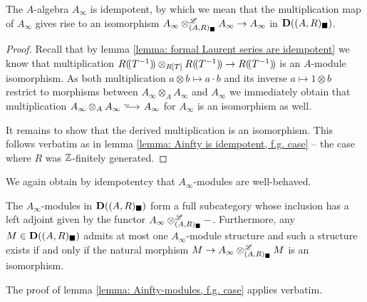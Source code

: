 \begin{lemma}
	
	The $A$-algebra $A_\infty$ is idempotent, by which we mean that the multiplication map of $A_\infty$ gives rise to an isomorphism $A_\infty\otimes^{\mathscr{L}}_{(A, R)_\blacksquare} A_\infty \to A_\infty$ in ${{\mathbf{D}}((A, R)_\blacksquare)}$.
\end{lemma}
\begin{proof}
	Recall that by lemma \ref{lemma: formal Laurent series are idempotent} we know that multiplication ${R(\!(T^{-1})\!)}\otimes_{R[T]}{R(\!(T^{-1})\!)}\to {R(\!(T^{-1})\!)}$ is an $A$-module isomorphism. As both multiplication $a\otimes b \mapsto a\cdot b$ and its inverse $a\mapsto 1\otimes b$ restrict to morphisms between $A_\infty\otimes_A A_\infty$ and $A_\infty$ we immediately obtain that multiplication $A_\infty\otimes_A A_\infty\isorightarrow A_\infty$ for $A_\infty$ is an isomorphism as well.
	
	It remains to show that the derived multiplication is an isomorphism. This follows verbatim as in lemma \ref{lemma: Ainfty is idempotent, f.g. case} -- the case where $R$ was ${\mathbb{Z}}$-finitely generated.
\end{proof}

We again obtain by idempotentcy that $A_\infty$-modules are well-behaved.
\begin{lemma}
	\label{lemma: Ainfty-modules are reflective}
	
	The $A_\infty$-modules in ${{\mathbf{D}}((A, R)_\blacksquare)}$ form a full subcategory whose inclusion has a left adjoint given by the functor $A_\infty\otimes^{\mathscr{L}}_{(A, R)_\blacksquare} -$. Furthermore, any $M \in {{\mathbf{D}}((A, R)_\blacksquare)}$ admits at most one $A_\infty$-module structure and such a structure exists if and only if the natural morphism $M\to A_\infty\otimes^{\mathscr{L}}_{(A, R)_\blacksquare} M$ is an isomorphism.
\end{lemma}
\begin{shortproof}
	The proof of lemma \ref{lemma: Ainfty-modules, f.g. case} applies verbatim.
\end{shortproof}

